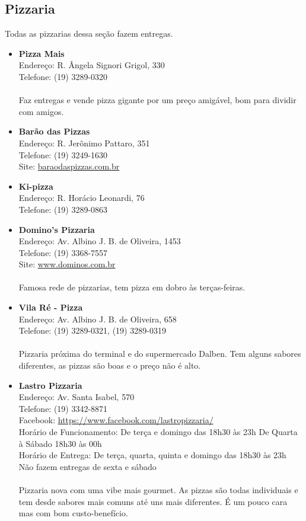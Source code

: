 \subsection{Pizzaria}

Todas as pizzarias dessa seção fazem entregas.

\begin{itemize}
\item \textbf{Pizza Mais}
  \\Endereço: R. Ângela Signori Grigol, 330
  \\Telefone: (19) 3289-0320
  \\
  \\Faz entregas e vende pizza gigante por um preço amigável, bom para dividir
  com amigos.

\item \textbf{Barão das Pizzas}
  \\Endereço: R. Jerônimo Pattaro, 351
  \\Telefone: (19) 3249-1630
  \\Site: \url{baraodaspizzas.com.br}

\item \textbf{Ki-pizza}
  \\Endereço: R. Horácio Leonardi, 76
  \\Telefone: (19) 3289-0863

\item \textbf{Domino's Pizzaria}
  \\Endereço: Av. Albino J. B. de Oliveira, 1453
  \\Telefone: (19) 3368-7557
  \\Site: \url{www.dominos.com.br}
  \\
  \\Famosa rede de pizzarias, tem pizza em dobro às terças-feiras.

\item \textbf{Vila Ré - Pizza}
  \\Endereço: Av. Albino J. B. de Oliveira, 658
  \\Telefone: (19) 3289-0321, (19) 3289-0319
  \\
  \\Pizzaria próxima do terminal e do supermercado Dalben. Tem alguns sabores
  diferentes, as pizzas são boas e o preço não é alto.

\item \textbf{Lastro Pizzaria}
  \\Endereço: Av. Santa Isabel, 570
  \\Telefone: (19) 3342-8871
  \\Facebook: \url{https://www.facebook.com/lastropizzaria/}
  \\Horário de Funcionamento: De terça e domingo das 18h30 às 23h
  De Quarta à Sábado 18h30 às 00h
  \\Horário de Entrega: De terça, quarta, quinta e domingo das 18h30 às 23h
  Não fazem entregas de sexta e sábado
  \\
  \\Pizzaria nova com uma vibe mais gourmet. As pizzas são todas individuais
  e tem desde sabores mais comuns até uns mais diferentes. É um pouco cara
  mas com bom custo-benefício.


\end{itemize}
